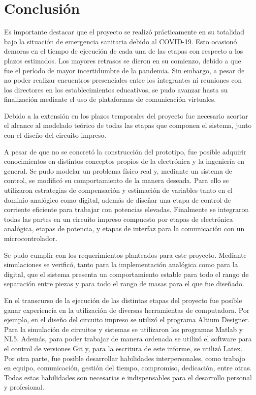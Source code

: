 \chapter{Conclusión}  \label{cap:Conclusión}
Es importante destacar que el proyecto se realizó prácticamente en su totalidad bajo la situación de emergencia sanitaria debido al COVID-19. Esto ocasionó demoras en el tiempo de ejecución de cada una de las etapas con respecto a los plazos estimados. Los mayores retrasos se dieron en su comienzo, debido a que fue el período de mayor incertidumbre de la pandemia. Sin embargo, a pesar de no poder realizar encuentros presenciales entre los integrantes ni reuniones con los directores en los establecimientos educativos, se pudo avanzar hasta su finalización  mediante el uso de plataformas de comunicación virtuales.

Debido a la extensión en los plazos temporales del proyecto fue necesario acortar el alcance al modelado teórico de todas las etapas que componen el sistema, junto con el diseño del circuito impreso.

A pesar de que no se concretó la construcción del prototipo, fue posible adquirir conocimientos en distintos conceptos propios de la electrónica y la ingeniería en general. Se pudo modelar un problema físico real y, mediante un sistema de control, se modificó su comportamiento de la manera deseada. Para ello se utilizaron estrategias de compensación y estimación de variables tanto en el dominio analógico como digital, además de diseñar una etapa de control de corriente eficiente para trabajar con potencias elevadas. Finalmente se integraron todas las partes en un circuito impreso compuesto por etapas de electrónica analógica, etapas de potencia, y etapas de interfaz para la comunicación con un microcontrolador.

Se pudo cumplir con los requerimientos planteados para este proyecto. Mediante simulaciones se verificó, tanto para la implementación analógica como para la digital, que el sistema presenta un comportamiento estable para todo el rango de separación entre piezas y para todo el rango de masas para el que fue diseñado. 

En el transcurso de la ejecución de las distintas etapas del proyecto fue posible ganar experiencia en la utilización de diversas herramientas de computadora. Por ejemplo, en el diseño del circuito impreso se utilizó el programa Altium Designer. Para la simulación de circuitos y sistemas se utilizaron los programas Matlab y NL5. Además, para poder trabajar de manera ordenada se utilizó el software para el control de versiones Git y, para la escritura de este informe, se utilizó Latex. Por otra parte, fue posible desarrollar habilidades interpersonales, como trabajo en equipo, comunicación, gestión del tiempo, compromiso, dedicación, entre otras. Todas estas habilidades son necesarias e indispensables para el desarrollo personal y profesional.

